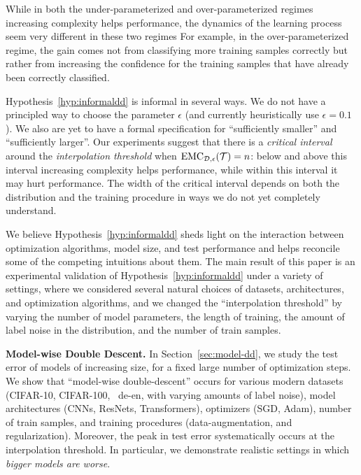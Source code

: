 While in both the under-parameterized and over-parameterized regimes increasing complexity helps performance, the dynamics of the learning process seem very different in these two regimes
For example, in the over-parameterized regime, the gain comes not from classifying more training samples correctly but rather from increasing the confidence for the training samples that have already been correctly classified. 
\fi

Hypothesis~\ref{hyp:informaldd} is informal in several ways.
We do not have a principled way to choose the parameter $\epsilon$ (and currently heuristically use $\epsilon=0.1$). 
We also are yet to have a formal specification for ``sufficiently smaller'' and ``sufficiently larger''.
Our experiments suggest that there is a \emph{critical interval}
around the \emph{interpolation threshold} when $\mathrm{EMC}_{\mathcal{D},\epsilon}(\mathcal{T}) = n$: below and above
this interval increasing complexity helps performance,
while within this interval it may hurt performance.
The width of the critical interval depends on both the distribution and
the training procedure in ways we do not yet completely understand.


We believe Hypothesis~\ref{hyp:informaldd} sheds light on the interaction between optimization algorithms, model size, and test performance and helps reconcile some of the competing intuitions about them.
The main result of this paper is an experimental validation of Hypothesis~\ref{hyp:informaldd} under a variety of settings, where we considered several natural choices of datasets, architectures, and optimization algorithms,
and we changed the ``interpolation threshold''
by varying the number of model parameters,
the length of training, the amount of label noise in the distribution, and the number of train samples.


{\bf Model-wise Double Descent.}
In Section~\ref{sec:model-dd},
we study the test error of models of increasing size,
for a fixed large number of optimization steps.
We show that ``model-wise double-descent'' occurs
for various modern datasets
(CIFAR-10, CIFAR-100, \iwslt~de-en, with varying amounts of label noise),
model architectures (CNNs, ResNets, Transformers),
optimizers (SGD, Adam),
number of train samples,
and training procedures (data-augmentation, and regularization).
Moreover, the peak in test error systematically occurs at the interpolation threshold.
In particular, we demonstrate realistic settings in which
\emph{bigger models are worse}.

